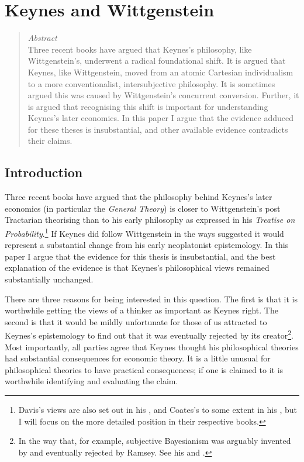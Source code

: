 
%
%
%
%
%
%
%
%
%
%
\chapter{Keynes and Wittgenstein}

\unpub{}

\begin{quote}
{\itshape
Abstract} \\
Three recent books have argued that Keynes's philosophy, like Wittgenstein's, underwent a radical foundational shift. It is argued that Keynes, like Wittgenstein, moved from an atomic Cartesian individualism to a more conventionalist, intersubjective philosophy. It is sometimes argued this was caused by Wittgenstein's concurrent conversion. Further, it is argued that recognising this shift is important for understanding Keynes's later economics. In this paper I argue that the evidence adduced for these theses is insubstantial, and other available evidence contradicts their claims. 
\end{quote}

\section{Introduction}

Three recent books \citep{Davis1994, Bateman1996, Coates1996} have argued that the philosophy behind Keynes's later economics (in particular the \textit{General Theory}) is closer to Wittgenstein's post Tractarian theorising than to his early philosophy as expressed in his \textit{Treatise on Probability}.\footnote{Davis's views are also set out in his \citeyearpar{Davis1995}, and Coates's to some extent in his \citeyearpar{Coates1997}, but I will focus on the more detailed position in their respective books.} If Keynes did follow Wittgenstein in the ways suggested it would represent a substantial change from his early neoplatonist epistemology. In this paper I argue that the evidence for this thesis is insubstantial, and the best explanation of the evidence is that Keynes's philosophical views remained substantially unchanged.

There are three reasons for being interested in this question. The first is that it is worthwhile getting the views of a thinker as important as Keynes right. The second is that it would be mildly unfortunate for those of us attracted to Keynes's epistemology to find out that it was eventually rejected by its creator\footnote{In the way that, for example, subjective Bayesianism was arguably invented by and eventually rejected by Ramsey. See his \citet{RamseyTruthProb} and \citet{Ramsey1929}.}. Most importantly, all parties agree that Keynes thought his philosophical theories had substantial consequences for economic theory. It is a little unusual for philosophical theories to have practical consequences; if one is claimed to it is worthwhile identifying and evaluating the claim.

